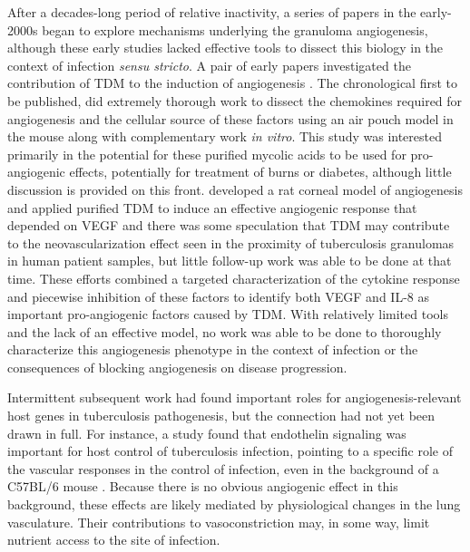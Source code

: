 After a decades\hyp{}long period of relative inactivity, a series of papers in the early\hyp{}2000s began to explore mechanisms underlying the granuloma angiogenesis, although these early studies lacked effective tools to dissect this biology in the context of infection \textit{sensu stricto}. A pair of early papers investigated the contribution of TDM to the induction of angiogenesis . The chronological first to be published, \citet{Sakaguchi2000} did extremely thorough work to dissect the chemokines required for angiogenesis and the cellular source of these factors using an air pouch model in the mouse along with complementary work \textit{in vitro}. This study was interested primarily in the potential for these purified mycolic acids to be used for pro\hyp{}angiogenic effects, potentially for treatment of burns or diabetes, although little discussion is provided on this front. \citet{Saita2000} developed a rat corneal model of angiogenesis and applied purified TDM to induce an effective angiogenic response that depended on VEGF and there was some speculation that TDM may contribute to the neovascularization effect seen in the proximity of tuberculosis granulomas in human patient samples, but little follow\hyp{}up work was able to be done at that time. These efforts combined a targeted characterization of the cytokine response and piecewise inhibition of these factors to identify both VEGF and IL\hyp{}8 as important pro\hyp{}angiogenic factors caused by TDM. With relatively limited tools and the lack of an effective model, no work was able to be done to thoroughly characterize this angiogenesis phenotype in the context of infection or the consequences of blocking angiogenesis on disease progression.

Intermittent subsequent work had found important roles for angiogenesis\hyp{}relevant host genes in tuberculosis pathogenesis, but the connection had not yet been drawn in full. For instance, a study found that endothelin signaling was important for host control of tuberculosis infection, pointing to a specific role of the vascular responses in the control of infection, even in the background of a C57BL/6 mouse \citep{Correa2014}. Because there is no obvious angiogenic effect in this background, these effects are likely mediated by physiological changes in the lung vasculature. Their contributions to vasoconstriction may, in some way, limit nutrient access to the site of infection.  

